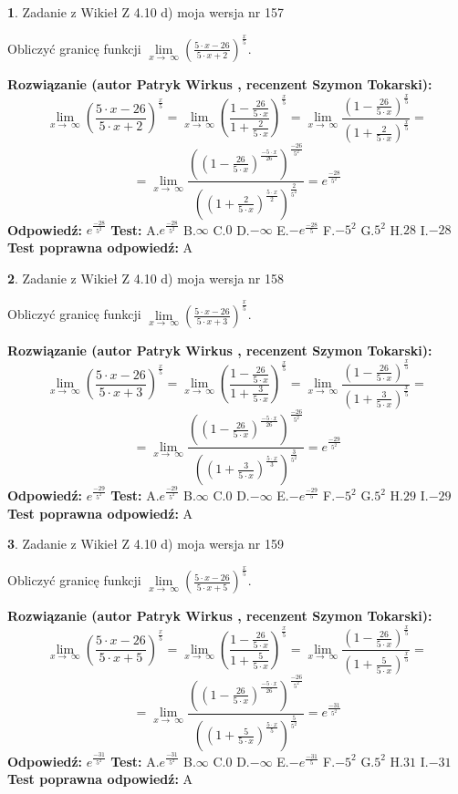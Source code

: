 \documentclass[12pt, a4paper]{article}
\theoremstyle{definition} %
\newtheorem{zad}{}
\newcommand{\zadStart}[1]{\begin{zad}#1\newline}
\newcommand{\zadStop}{\end{zad}}
\newcommand{\rozwStart}[2]{\noindent \textbf{Rozwiązanie (autor #1 , recenzent #2): }\newline}
\newcommand{\rozwStop}{\newline}
\newcommand{\odpStart}{\noindent \textbf{Odpowiedź:}\newline}
\newcommand{\odpStop}{\newline}
\newcommand{\testStart}{\noindent \textbf{Test:}\newline}
\newcommand{\testStop}{\newline}
\newcommand{\kluczStart}{\noindent \textbf{Test poprawna odpowiedź:}\newline}
\newcommand{\kluczStop}{\newline}
\begin{document}
\zadStart{Zadanie z Wikieł Z 4.10 d) moja wersja nr 157}


Obliczyć granicę funkcji  $\lim\limits_{x\to\ \infty}(\frac{5\cdot x-26}{5\cdot x+2})^{\frac{x}{5}}$.
\zadStop
\rozwStart{Patryk Wirkus}{Szymon Tokarski}
$$\lim\limits_{x\to\ \infty}(\frac{5\cdot x-26}{5\cdot x+2})^{\frac{x}{5}} = \lim\limits_{x\to\ \infty}(\frac{1-\frac{26}{5\cdot x}}{1+\frac{2}{5\cdot x}})^{\frac{x}{5}}=\lim\limits_{x\to\ \infty}\frac{(1-\frac{26}{5\cdot x})^{\frac{x}{5}}}{(1+\frac{2}{5\cdot x})^{\frac{x}{5}}}=$$
$$=\lim\limits_{x\to\ \infty}\frac{((1-\frac{26}{5\cdot x})^{\frac{-5\cdot x}{26}})^{\frac{-26}{5^{2}}}}{((1+\frac{2}{5\cdot x})^{\frac{5\cdot x}{2}})^{\frac{2}{5^{2}}}}=e^{\frac{-28}{5^{2}}}$$
\rozwStop
\odpStart
$e^{\frac{-28}{5^{2}}}$
\odpStop
\testStart
A.$e^{\frac{-28}{5^{2}}}$ B.$\infty$ C.$0$ D.$-\infty$ E.$-e^{\frac{-28}{5}}$
F.$-5^{2}$ G.$5^{2}$
H.$28$
I.$-28$
\testStop
\kluczStart
A
\kluczStop



\zadStart{Zadanie z Wikieł Z 4.10 d) moja wersja nr 158}


Obliczyć granicę funkcji  $\lim\limits_{x\to\ \infty}(\frac{5\cdot x-26}{5\cdot x+3})^{\frac{x}{5}}$.
\zadStop
\rozwStart{Patryk Wirkus}{Szymon Tokarski}
$$\lim\limits_{x\to\ \infty}(\frac{5\cdot x-26}{5\cdot x+3})^{\frac{x}{5}} = \lim\limits_{x\to\ \infty}(\frac{1-\frac{26}{5\cdot x}}{1+\frac{3}{5\cdot x}})^{\frac{x}{5}}=\lim\limits_{x\to\ \infty}\frac{(1-\frac{26}{5\cdot x})^{\frac{x}{5}}}{(1+\frac{3}{5\cdot x})^{\frac{x}{5}}}=$$
$$=\lim\limits_{x\to\ \infty}\frac{((1-\frac{26}{5\cdot x})^{\frac{-5\cdot x}{26}})^{\frac{-26}{5^{2}}}}{((1+\frac{3}{5\cdot x})^{\frac{5\cdot x}{3}})^{\frac{3}{5^{2}}}}=e^{\frac{-29}{5^{2}}}$$
\rozwStop
\odpStart
$e^{\frac{-29}{5^{2}}}$
\odpStop
\testStart
A.$e^{\frac{-29}{5^{2}}}$ B.$\infty$ C.$0$ D.$-\infty$ E.$-e^{\frac{-29}{5}}$
F.$-5^{2}$ G.$5^{2}$
H.$29$
I.$-29$
\testStop
\kluczStart
A
\kluczStop



\zadStart{Zadanie z Wikieł Z 4.10 d) moja wersja nr 159}


Obliczyć granicę funkcji  $\lim\limits_{x\to\ \infty}(\frac{5\cdot x-26}{5\cdot x+5})^{\frac{x}{5}}$.
\zadStop
\rozwStart{Patryk Wirkus}{Szymon Tokarski}
$$\lim\limits_{x\to\ \infty}(\frac{5\cdot x-26}{5\cdot x+5})^{\frac{x}{5}} = \lim\limits_{x\to\ \infty}(\frac{1-\frac{26}{5\cdot x}}{1+\frac{5}{5\cdot x}})^{\frac{x}{5}}=\lim\limits_{x\to\ \infty}\frac{(1-\frac{26}{5\cdot x})^{\frac{x}{5}}}{(1+\frac{5}{5\cdot x})^{\frac{x}{5}}}=$$
$$=\lim\limits_{x\to\ \infty}\frac{((1-\frac{26}{5\cdot x})^{\frac{-5\cdot x}{26}})^{\frac{-26}{5^{2}}}}{((1+\frac{5}{5\cdot x})^{\frac{5\cdot x}{5}})^{\frac{5}{5^{2}}}}=e^{\frac{-31}{5^{2}}}$$
\rozwStop
\odpStart
$e^{\frac{-31}{5^{2}}}$
\odpStop
\testStart
A.$e^{\frac{-31}{5^{2}}}$ B.$\infty$ C.$0$ D.$-\infty$ E.$-e^{\frac{-31}{5}}$
F.$-5^{2}$ G.$5^{2}$
H.$31$
I.$-31$
\testStop
\kluczStart
A
\kluczStop
\end{document}
